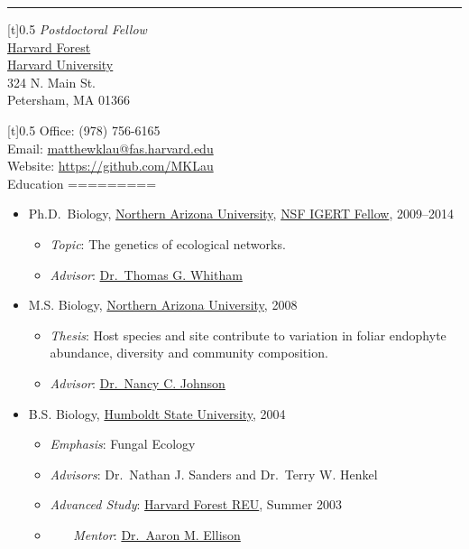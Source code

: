 \documentclass[]{article}
\author{}
\date{}
\begin{document}
\begin{center}\rule{3in}{0.4pt}\end{center}

{[}t{]}{0.5} \emph{Postdoctoral
Fellow}\\\href{http://harvardforest.fas.harvard.edu}{Harvard
Forest}\\\href{http://harvard.edu}{Harvard University}\\324 N. Main
St.\\Petersham, MA 01366

{[}t{]}{0.5} Office: (978) 756-6165\\Email:
\href{mailto:matthewklau@fas.harvard.edu}{matthewklau@fas.harvard.edu}\\Website:
\url{https://github.com/MKLau}\\ Education =========

\begin{itemize}
\item
  Ph.D.~Biology, \href{http://www.nau.edu}{Northern Arizona University},
  \href{http://www.mpcer.nau.edu/igert/}{NSF IGERT Fellow}, 2009--2014

  \begin{itemize}
  \item
    \emph{Topic}: The genetics of ecological networks.
  \item
    \emph{Advisor}:
    \href{http://www6.nau.edu/biology/People/Faculty/Whitham/Whitham.htm}{Dr.~Thomas
    G. Whitham}
  \end{itemize}
\item
  M.S. Biology, \href{http://www.nau.edu}{Northern Arizona University},
  2008

  \begin{itemize}
  \item
    \emph{Thesis}: Host species and site contribute to variation in
    foliar endophyte abundance, diversity and community composition.
  \item
    \emph{Advisor}:
    \href{http://www.nau.edu/~envsci/johnsonlab/index.htm}{Dr.~Nancy C.
    Johnson}
  \end{itemize}
\item
  B.S. Biology, \href{http://www.humboldt.edu/~biosci/}{Humboldt State
  University}, 2004

  \begin{itemize}
  \item
    \emph{Emphasis}: Fungal Ecology
  \item
    \emph{Advisors}: Dr.~Nathan J. Sanders and Dr.~Terry W. Henkel
  \item
    \emph{Advanced Study}:
    \href{http://harvardforest.fas.harvard.edu/education/reu/reu.html}{Harvard
    Forest REU}, Summer 2003
  \item
    ~~~ \emph{Mentor}:
    \href{http://harvardforest.fas.harvard.edu/profiles/ellison.html}{Dr.~Aaron
    M. Ellison}
  \end{itemize}
\end{itemize}
\end{document}
